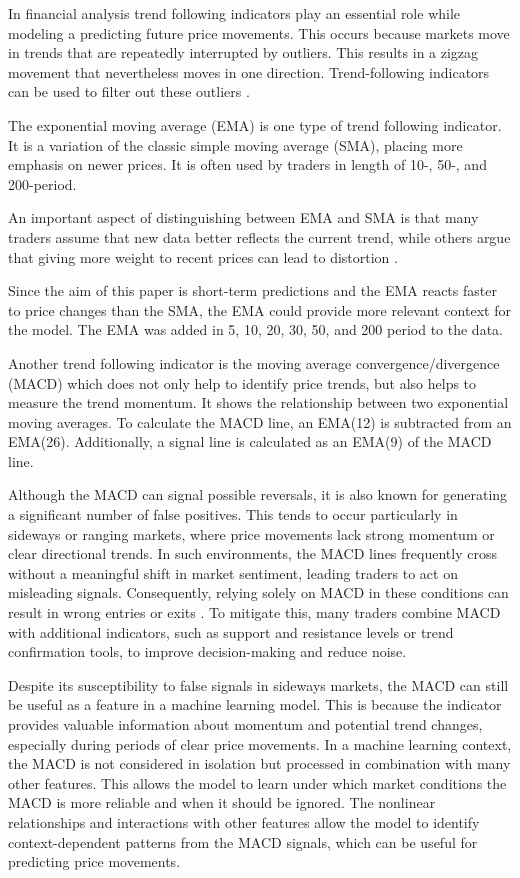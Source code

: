In financial analysis trend following indicators play an essential role while modeling a predicting future price movements.
This occurs because markets move in trends that are repeatedly interrupted by outliers.
This results in a zigzag movement that nevertheless moves in one direction.
Trend-following indicators can be used to filter out these outliers \cite{investopia-trend-indicators}.

The exponential moving average (EMA) is one type of trend following indicator.
It is a variation of the classic simple moving average (SMA), placing more emphasis on newer prices.
It is often used by traders in length of 10-, 50-, and 200-period.

An important aspect of distinguishing between EMA and SMA is that many traders assume that new data better reflects the current trend, while others argue that giving more weight to recent prices can lead to distortion
\cite{investopia-ema}.


Since the aim of this paper is short-term predictions and the EMA reacts faster to price changes than the SMA, the EMA could provide more relevant context for the model.
The EMA was added in 5, 10, 20, 30, 50, and 200 period to the data.

Another trend following indicator is the moving average convergence/divergence (MACD) which does not only help to identify price trends, but also helps to measure the trend momentum.
It shows the relationship between two exponential moving averages.
To calculate the MACD line, an EMA(12) is subtracted from an EMA(26).
Additionally, a signal line is calculated as an EMA(9) of the MACD line.


Although the MACD can signal possible reversals, it is also known for generating a significant number of false positives.
This tends to occur particularly in sideways or ranging markets, where price movements lack strong momentum or clear directional trends.
In such environments, the MACD lines frequently cross without a meaningful shift in market sentiment, leading traders to act on misleading signals.
Consequently, relying solely on MACD in these conditions can result in wrong entries or exits \cite{investopia-macd}.
To mitigate this, many traders combine MACD with additional indicators, such as support and resistance levels or trend confirmation tools, to improve decision-making and reduce noise.

Despite its susceptibility to false signals in sideways markets, the MACD can still be useful as a feature in a machine learning model.
This is because the indicator provides valuable information about momentum and potential trend changes, especially during periods of clear price movements.
In a machine learning context, the MACD is not considered in isolation but processed in combination with many other features.
This allows the model to learn under which market conditions the MACD is more reliable and when it should be ignored.
The nonlinear relationships and interactions with other features allow the model to identify context-dependent patterns from the MACD signals, which can be useful for predicting price movements.


